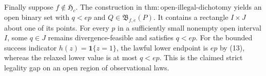 Finally suppose \(f\notin\mathfrak H_c\).  The construction in \(\mathrm{thm:open\text{-}illegal\text{-}dichotomy}\) yields an open binary set with \(q<ep\) and \(Q\in\mathfrak B_{f,e}(P)\).  It contains a rectangle \(I\times J\) about one of its points.  For every \(p\) in a sufficiently small nonempty open interval \(I\), some \(q\in J\) remains divergence-feasible and satisfies \(q<ep\).  For the bounded success indicator \(h(z)=\mathbf 1\{z=1\}\), the lawful lower endpoint is \(ep\) by (13), whereas the relaxed lower value is at most \(q<ep\).  This is the claimed strict legality gap on an open region of observational laws.